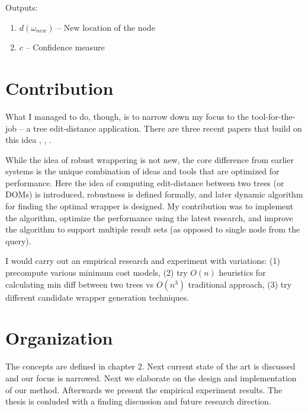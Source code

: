 Outputs: 

\begin{enumerate}
	\item $d(\omega_{new})$ -- New location of the node 
	\item $c$ -- Confidence measure 
\end{enumerate}


\section{Contribution}


What I managed to do, though, is to narrow down my focus to the tool-for-the-job – a tree edit-distance application. There are three recent papers that build on this idea \cite{DBLP:conf/sigmod/DalviBS09}, \cite{DBLP:journals/pvldb/ParameswaranDGR11}, \cite{DBLP:conf/wism/LiuWYL12}.

While the idea of robust wrappering is not new, the core difference from earlier systems is the unique combination of ideas and tools that are optimized for performance.
Here the idea of computing edit-distance between two trees (or DOMs) is introduced, robustness is defined formally, and later dynamic algorithm for finding the optimal wrapper is designed. My contribution was to implement the algorithm, optimize the performance using the latest research, and improve the algorithm to support multiple result sets (as opposed to single node from the query).

I would carry out an empirical research and experiment with variations: (1) precompute various minimum cost models, (2) try $O(n)$ heuristics for calculating min diff between two trees vs $O(n^3)$ traditional approach, (3) try different candidate wrapper generation techniques.


\section{Organization}

The concepts are defined in chapter 2. Next current state of the art is discussed and our focus is narrowed. Next we elaborate on the design and implementation of our method. Afterwards we present the empirical experiment results. The thesis is conluded with a finding discussion and future research direction.


